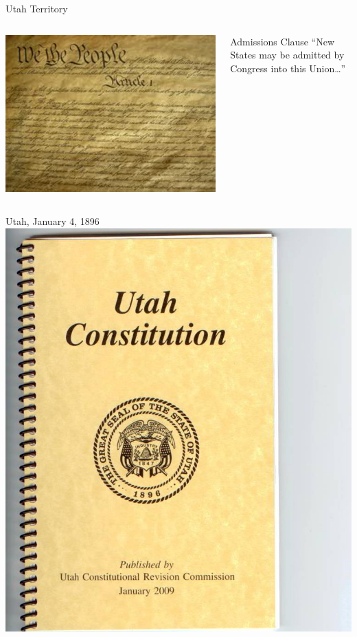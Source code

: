 \begin{frame}{Utah Territory}
    \begin{columns}[onlytextwidth]
            \centering
            \includegraphics[height=0.75\textheight]{img/constitution.png} \\

            \begin{block}{Admissions Clause}
                ``New States may be admitted by Congress into this Union\ldots''
            \end{block}
    \end{columns}
\end{frame}

\begin{frame}{Utah, January 4, 1896}
    \centering
    \includegraphics[height=0.75\textheight]{img/utah-constitution.png} \\
\end{frame}

